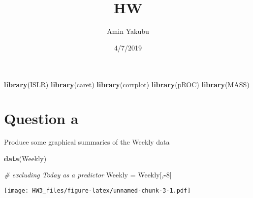 \documentclass[]{article}
\title{HW}
\author{Amin Yakubu}
\date{4/7/2019}
\newenvironment{Shaded}{\begin{snugshade}}{\end{snugshade}}
\newcommand{\KeywordTok}[1]{\textcolor[rgb]{0.13,0.29,0.53}{\textbf{#1}}}
\newcommand{\DataTypeTok}[1]{\textcolor[rgb]{0.13,0.29,0.53}{#1}}
\newcommand{\DecValTok}[1]{\textcolor[rgb]{0.00,0.00,0.81}{#1}}
\newcommand{\StringTok}[1]{\textcolor[rgb]{0.31,0.60,0.02}{#1}}
\newcommand{\CommentTok}[1]{\textcolor[rgb]{0.56,0.35,0.01}{\textit{#1}}}
\newcommand{\OperatorTok}[1]{\textcolor[rgb]{0.81,0.36,0.00}{\textbf{#1}}}
\newcommand{\NormalTok}[1]{#1}
\begin{document}
\maketitle

\begin{Shaded}
\begin{Highlighting}[]
\KeywordTok{library}\NormalTok{(ISLR)}
\KeywordTok{library}\NormalTok{(caret)}
\KeywordTok{library}\NormalTok{(corrplot)}
\KeywordTok{library}\NormalTok{(pROC)}
\KeywordTok{library}\NormalTok{(MASS)}
\end{Highlighting}
\end{Shaded}

\section{Question a}\label{question-a}

Produce some graphical summaries of the Weekly data

\begin{Shaded}
\begin{Highlighting}[]
\KeywordTok{data}\NormalTok{(Weekly)}

\CommentTok{# excluding Today as a predictor}
\NormalTok{Weekly =}\StringTok{ }\NormalTok{Weekly[,}\OperatorTok{-}\DecValTok{8}\NormalTok{]}
\end{Highlighting}
\end{Shaded}

\begin{Shaded}
\end{Shaded}

\texttt{[image: HW3\_files/figure-latex/unnamed-chunk-3-1.pdf]}
\end{document}
